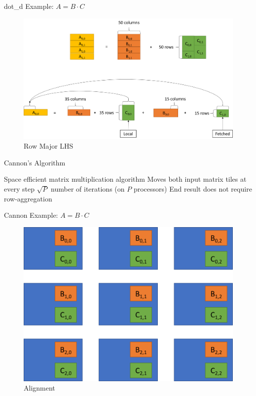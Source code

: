 \documentclass[10pt]{beamer}
\begin{document}
\begin{frame}{dot\_d Example: $A = B \cdot C$ }
	\begin{figure}	
		\centering
		\includegraphics[width=0.66\linewidth]{figures/row_major_lhs_dot_d.png}
		\caption{Row Major LHS}
	\end{figure}
\end{frame}

\begin{frame}{Cannon's Algorithm}
	\begin{outline}
		\1 Space efficient matrix multiplication algorithm
		\1 Moves both input matrix tiles at every step
			\2 $\sqrt{P}$ number of iterations (on $P$ processors)
		\1 End result does not require row-aggregation
	\end{outline}
\end{frame}

\begin{frame}{Cannon Example: $A = B \cdot C$}
	\begin{figure}	
		\centering
		\includegraphics[width=0.72\linewidth]{figures/cannon_zeroth_iteration.png}
		\caption{Alignment}
	\end{figure}
\end{frame}
\end{document}
